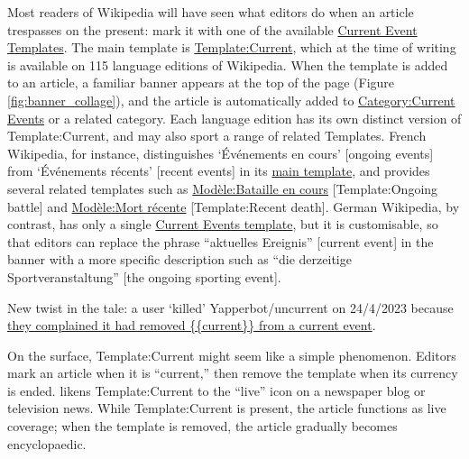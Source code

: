 \documentclass[Royal,times,sageh]{sagej}
\begin{document}
Most readers of Wikipedia will have seen what editors do when an article
trespasses on the present: mark it with one of the available
\href{https://en.wikipedia.org/wiki/Wikipedia:Current_event_templates}{Current
Event Templates}. The main template is
\href{https://en.wikipedia.org/wiki/Template:Current}{Template:Current},
which at the time of writing is available on 115 language editions of
Wikipedia. When the template is added to an article, a familiar banner
appears at the top of the page (Figure \ref{fig:banner_collage}), and
the article is automatically added to
\href{https://en.wikipedia.org/wiki/Category:Current_events}{Category:Current
Events} or a related category. Each language edition has its own
distinct version of Template:Current, and may also sport a range of
related Templates. French Wikipedia, for instance, distinguishes
`Événements en cours' {[}ongoing events{]} from `Événements récents'
{[}recent events{]} in its
\href{https://fr.wikipedia.org/wiki/Mod\%C3\%A8le:\%C3\%89v\%C3\%A9nement_en_cours}{main
template}, and provides several related templates such as
\href{https://fr.wikipedia.org/wiki/Mod\%C3\%A8le:Bataille_en_cours}{Modèle:Bataille
en cours} {[}Template:Ongoing battle{]} and
\href{https://fr.wikipedia.org/wiki/Mod\%C3\%A8le:Mort_r\%C3\%A9cente}{Modèle:Mort
récente} {[}Template:Recent death{]}. German Wikipedia, by contrast, has
only a single
\href{https://de.wikipedia.org/wiki/Vorlage:Laufendes_Ereignis}{Current
Events template}, but it is customisable, so that editors can replace
the phrase ``aktuelles Ereignis'' {[}current event{]} in the banner with
a more specific description such as ``die derzeitige
Sportveranstaltung'' {[}the ongoing sporting event{]}.

New twist in the tale: a user `killed' Yapperbot/uncurrent on 24/4/2023
because
\href{https://en.wikipedia.org/w/index.php?diff=1151461527\&oldid=986550108\&title=User\%3AYapperbot\%2Fkill\%2FUncurrenter}{they
complained it had removed \{\{current\}\} from a current event}.

On the surface, Template:Current might seem like a simple phenomenon.
Editors mark an article when it is ``current,'' then remove the template
when its currency is ended. \citet{avieson_breaking_2019} likens
Template:Current to the ``live'' icon on a newspaper blog or television
news. While Template:Current is present, the article functions as live
coverage; when the template is removed, the article gradually becomes
encyclopaedic.
\end{document}

